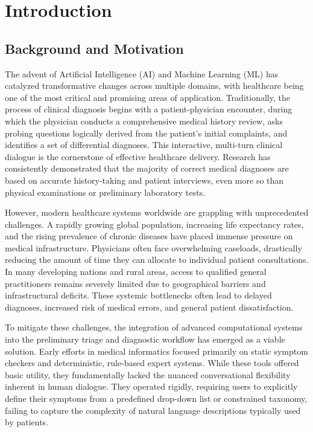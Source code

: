\documentclass[12pt]{article}
\begin{document}
\section{Introduction}

\subsection{Background and Motivation}
The advent of Artificial Intelligence (AI) and Machine Learning (ML) has catalyzed transformative changes across multiple domains, with healthcare being one of the most critical and promising areas of application. Traditionally, the process of clinical diagnosis begins with a patient-physician encounter, during which the physician conducts a comprehensive medical history review, asks probing questions logically derived from the patient's initial complaints, and identifies a set of differential diagnoses. This interactive, multi-turn clinical dialogue is the cornerstone of effective healthcare delivery. Research has consistently demonstrated that the majority of correct medical diagnoses are based on accurate history-taking and patient interviews, even more so than physical examinations or preliminary laboratory tests.

However, modern healthcare systems worldwide are grappling with unprecedented challenges. A rapidly growing global population, increasing life expectancy rates, and the rising prevalence of chronic diseases have placed immense pressure on medical infrastructure. Physicians often face overwhelming caseloads, drastically reducing the amount of time they can allocate to individual patient consultations. In many developing nations and rural areas, access to qualified general practitioners remains severely limited due to geographical barriers and infrastructural deficits. These systemic bottlenecks often lead to delayed diagnoses, increased risk of medical errors, and general patient dissatisfaction. 

To mitigate these challenges, the integration of advanced computational systems into the preliminary triage and diagnostic workflow has emerged as a viable solution. Early efforts in medical informatics focused primarily on static symptom checkers and deterministic, rule-based expert systems. While these tools offered basic utility, they fundamentally lacked the nuanced conversational flexibility inherent in human dialogue. They operated rigidly, requiring users to explicitly define their symptoms from a predefined drop-down list or constrained taxonomy, failing to capture the complexity of natural language descriptions typically used by patients.
\end{document}
